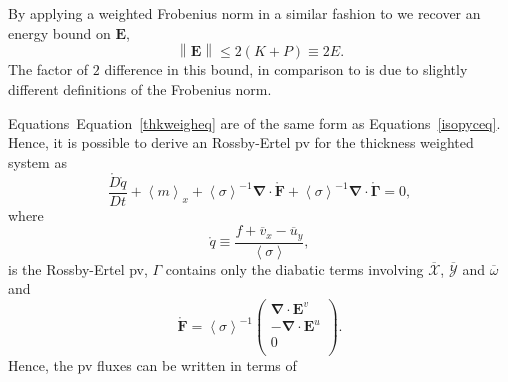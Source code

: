 \documentclass[12pt,a4paper]{report}
\newcommand*\thkmean[1]{\overline{#1}}
\newcommand*\nthkmean[1]{\left\langle{#1}\right\rangle}
\newcommand*\spec[1]{\mathring{#1}}
\newcommand*\equref[1]{Equation~\eqref{#1}}
\begin{document}
                     By applying a weighted Frobenius norm in a similar fashion to 
                     \cite{marshall2012framework} we recover an energy bound on
                      $\boldsymbol{E}$,
                      \begin{equation}
                      {\left\|\boldsymbol{E}\right\|\leq 2\left(K+P\right)\equiv 2E}.
                      \end{equation} 
                      The factor of $2$ difference in this bound, in comparison to
                      \cite{marshall2012framework} is due to slightly different definitions of the
                       Frobenius norm.
                      
                      Equations~\equref{thkweigheq} are of the same form as Equations~\eqref{isopyceq}.
                      Hence, it is possible to derive an
                      Rossby-Ertel \gls{pv} for the thickness weighted system
                      as
                      \begin{equation}
                      \frac{\spec{D} \spec{q}}{D t} + \nthkmean{m}_{x} 
                      +\nthkmean{\sigma}^{-1}\boldsymbol{\nabla}\cdot\spec{\boldsymbol{F}}
                      +\nthkmean{\sigma}^{-1}\boldsymbol{\nabla}\cdot\spec{\boldsymbol{\Gamma}}=0,
                      \end{equation} 
                      where
                      \begin{equation}
                      \spec{q}\equiv\frac{f+\thkmean{v}_{x}-\thkmean{u}_{y}}{\nthkmean{\sigma}},
                      \end{equation}
                      is the Rossby-Ertel \gls{pv}, $\Gamma$ contains only the diabatic terms involving $\thkmean{\mathcal{X}} $, $\thkmean{\mathcal{Y}} $ and $\thkmean{\omega} $ and 
                      \begin{equation}
                      \spec{\boldsymbol{F}}=\nthkmean{\sigma}^{-1}\left(
                      \begin{array}{c}
                      \boldsymbol{\nabla}\cdot\boldsymbol{E}^v \\
                      -\boldsymbol{\nabla}\cdot\boldsymbol{E}^u\\
                      0 \\
                      \end{array}\right).
                      \end{equation}
                      Hence, the \gls{pv} fluxes can be written in terms of
\end{document}
